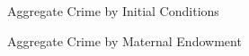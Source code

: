 \begin{frame}\begin{figure}\caption{Aggregate Crime by Initial Conditions}\vspace{0.3cm}
\end{figure}\end{frame}
\begin{frame}\begin{figure}\caption{Aggregate Crime by Maternal Endowment}\vspace{0.3cm}
\end{figure}\end{frame}
